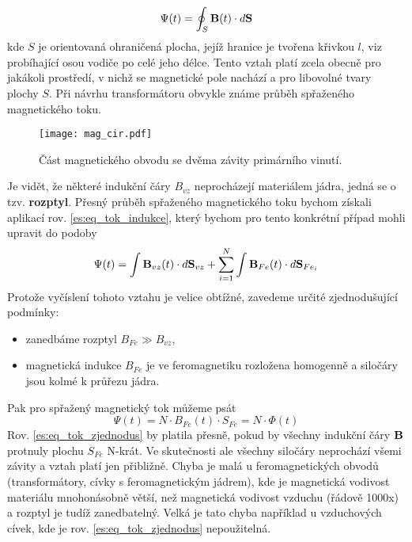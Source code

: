       \begin{equation}\label{es:eq_tok_indukce}
        \Psi(t) = \oint_S\mathbf{B}(t)\cdot d\mathbf{S}
      \end{equation}
      kde $S$ je orientovaná ohraničená plocha, jejíž hranice je tvořena křivkou $l$, viz
      probíhající osou vodiče po celé jeho délce. Tento vztah platí zcela obecně pro jakákoli
      prostředí, v nichž se magnetické pole nachází a pro libovolné tvary plochy $S$. Při návrhu
      transformátoru obvykle známe průběh spřaženého magnetického toku.
      \begin{figure}[ht!]
        \centering
        \texttt{[image: mag\_cir.pdf]}
        \caption{Část magnetického obvodu se dvěma závity primárního vinutí.}
        \label{es:fig_Bzv}
      \end{figure}
      Je vidět, že některé indukční čáry $B_{vz}$ neprocházejí materiálem jádra, jedná se o tzv.
      \textbf{rozptyl}. Přesný průběh spřaženého magnetického toku bychom získali aplikací rov.
      \ref{es:eq_tok_indukce}, který bychom pro tento konkrétní případ mohli upravit do podoby
      \begin{equation}\label{es:eq_tok2}
        \Psi(t) = \int \mathbf{B}_{vz}(t)\cdot d\mathbf{S}_{vz} + \sum_{i=1}^{N}\int \mathbf{B}_{Fe}(t)\cdot
        d\mathbf{S}_{Fe_i}
      \end{equation}
      Protože vyčíslení tohoto vztahu je velice obtížné, zavedeme určité zjednodušující podmínky:
      \begin{itemize}
        \item zanedbáme rozptyl $B_{Fe} \gg B_{vz}$,
        \item magnetická indukce $B_{Fe}$ je ve feromagnetiku rozložena homogenně a siločáry jsou
              kolmé k průřezu jádra.
      \end{itemize}
      Pak pro spřažený magnetický tok můžeme psát
      \begin{equation}\label{es:eq_tok_zjednodus}
        \Psi(t) = N\cdot B_{Fe}(t)\cdot S_{Fe} = N \cdot \Phi(t)
      \end{equation}
      Rov. \ref{es:eq_tok_zjednodus} by platila přesně, pokud by všechny indukční čáry $\mathbf{B}$
      protnuly plochu $S_{Fe}$ N-krát. Ve skutečnosti ale všechny siločáry neprochází všemi závity a
      vztah platí jen přibližně. Chyba je malá u feromagnetických obvodů (transformátory, cívky s
      feromagnetickým jádrem), kde je magnetická vodivost materiálu mnohonásobně větší, než
      magnetická vodivost vzduchu (řádově 1000x) a rozptyl je tudíž zanedbatelný. Velká je tato
      chyba například u vzduchových cívek, kde je  rov. \ref{es:eq_tok_zjednodus} nepoužitelná.
            
